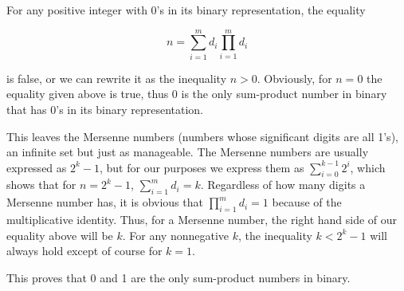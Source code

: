 \documentclass[12pt]{article}
\begin{document}
For any positive integer with 0's in its binary representation, the equality

$$n = \sum_{i = 1}^m d_i \prod_{i = 1}^m d_i$$

is false, or we can rewrite it as the inequality $n > 0$. Obviously, for $n = 0$ the equality given above is true, thus 0 is the only sum-product number in binary that has 0's in its binary representation.

This leaves the Mersenne numbers (numbers whose significant digits are all 1's), an infinite set but just as manageable. The Mersenne numbers are usually expressed as $2^k - 1$, but for our purposes we express them as $\displaystyle \sum_{i = 0}^{k - 1} 2^i$, which shows that for $n = 2^k - 1$, $\displaystyle \sum_{i = 1}^m d_i = k$. Regardless of how many digits a Mersenne number has, it is obvious that $\displaystyle \prod_{i = 1}^m d_i = 1$ because of the multiplicative identity. Thus, for a Mersenne number, the right hand side of our equality above will be $k$. For any nonnegative $k$, the inequality $k < 2^k - 1$ will always hold except of course for $k = 1$.

This proves that 0 and 1 are the only sum-product numbers in binary.
\end{document}
